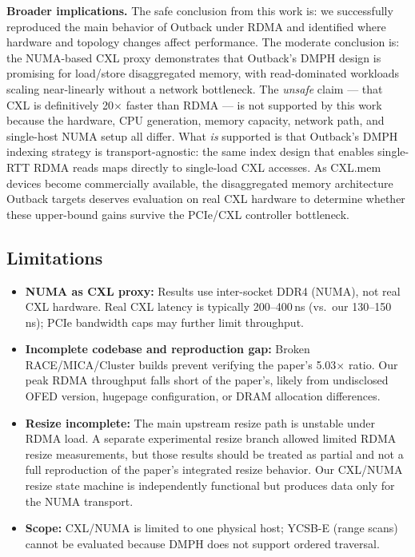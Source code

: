 \documentclass[conference]{IEEEtran}
\begin{document}
\textbf{Broader implications.} The safe conclusion from this work is: we successfully reproduced the main behavior of Outback under RDMA and identified where hardware and topology changes affect performance. The moderate conclusion is: the NUMA-based CXL proxy demonstrates that Outback's DMPH design is promising for load/store disaggregated memory, with read-dominated workloads scaling near-linearly without a network bottleneck. The \emph{unsafe} claim --- that CXL is definitively 20$\times$ faster than RDMA --- is not supported by this work because the hardware, CPU generation, memory capacity, network path, and single-host NUMA setup all differ. What \emph{is} supported is that Outback's DMPH indexing strategy is transport-agnostic: the same index design that enables single-RTT RDMA reads maps directly to single-load CXL accesses. As CXL.mem devices become commercially available, the disaggregated memory architecture Outback targets deserves evaluation on real CXL hardware to determine whether these upper-bound gains survive the PCIe/CXL controller bottleneck.

\subsection{Limitations}\label{sec:conclusion-limitations}

\begin{itemize}[nosep]
  \item \textbf{NUMA as CXL proxy:} Results use inter-socket DDR4 (NUMA), not real CXL hardware. Real CXL latency is typically 200--400\,ns (vs.\ our 130--150\,ns); PCIe bandwidth caps may further limit throughput.

  \item \textbf{Incomplete codebase and reproduction gap:} Broken RACE/MICA/Cluster builds prevent verifying the paper's 5.03$\times$ ratio. Our peak RDMA throughput falls short of the paper's, likely from undisclosed OFED version, hugepage configuration, or DRAM allocation differences.

  \item \textbf{Resize incomplete:} The main upstream resize path is unstable under RDMA load. A separate experimental resize branch allowed limited RDMA resize measurements, but those results should be treated as partial and not a full reproduction of the paper's integrated resize behavior. Our CXL/NUMA resize state machine is independently functional but produces data only for the NUMA transport.

  \item \textbf{Scope:} CXL/NUMA is limited to one physical host; YCSB-E (range scans) cannot be evaluated because DMPH does not support ordered traversal.
\end{itemize}
\end{document}
